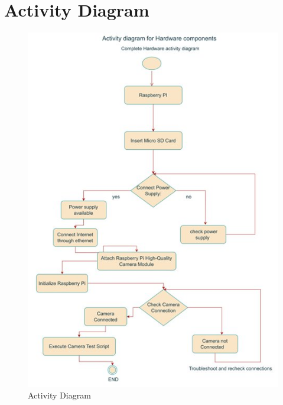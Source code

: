 \documentclass[openany]{report}
\begin{document}
\section{Activity Diagram}
\begin{figure}[H]
    \centering
    \includegraphics[width=.95\textwidth]{../imgs/activity 1.jpg}
    \caption{Activity Diagram}
\end{figure}
\end{document}
